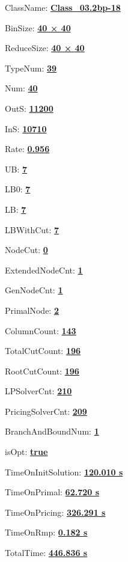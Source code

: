 \documentclass[11pt]{article}
\begin{document}
\pagestyle{empty}


ClassName: \underline{\textbf{Class_03.2bp-18}}
\par
BinSize: \underline{\textbf{40 × 40}}
\par
ReduceSize: \underline{\textbf{40 × 40}}
\par
TypeNum: \underline{\textbf{39}}
\par
Num: \underline{\textbf{40}}
\par
OutS: \underline{\textbf{11200}}
\par
InS: \underline{\textbf{10710}}
\par
Rate: \underline{\textbf{0.956}}
\par
UB: \underline{\textbf{7}}
\par
LB0: \underline{\textbf{7}}
\par
LB: \underline{\textbf{7}}
\par
LBWithCut: \underline{\textbf{7}}
\par
NodeCut: \underline{\textbf{0}}
\par
ExtendedNodeCnt: \underline{\textbf{1}}
\par
GenNodeCnt: \underline{\textbf{1}}
\par
PrimalNode: \underline{\textbf{2}}
\par
ColumnCount: \underline{\textbf{143}}
\par
TotalCutCount: \underline{\textbf{196}}
\par
RootCutCount: \underline{\textbf{196}}
\par
LPSolverCnt: \underline{\textbf{210}}
\par
PricingSolverCnt: \underline{\textbf{209}}
\par
BranchAndBoundNum: \underline{\textbf{1}}
\par
isOpt: \underline{\textbf{true}}
\par
TimeOnInitSolution: \underline{\textbf{120.010 s}}
\par
TimeOnPrimal: \underline{\textbf{62.720 s}}
\par
TimeOnPricing: \underline{\textbf{326.291 s}}
\par
TimeOnRmp: \underline{\textbf{0.182 s}}
\par
TotalTime: \underline{\textbf{446.836 s}}
\par
\newpage


\end{document}
